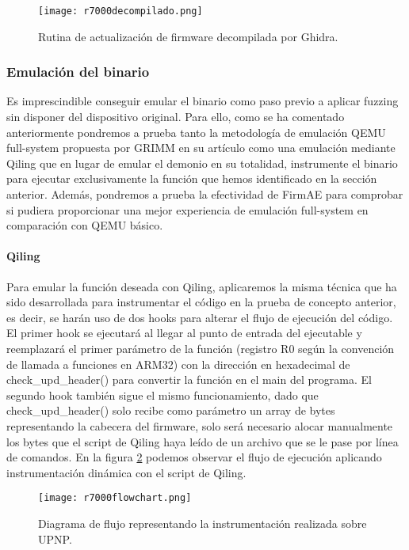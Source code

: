\begin{figure}[H]
    \centering
    \texttt{[image: r7000decompilado.png]}
    \caption{Rutina de actualización de firmware decompilada por Ghidra.}
    \label{fig:R7000decompilado}
\end{figure}

\subsubsection{Emulación del binario}
Es imprescindible conseguir emular el binario como paso previo a aplicar fuzzing sin disponer del dispositivo original. Para ello, como se ha comentado 
anteriormente pondremos a prueba tanto la metodología de emulación QEMU full-system propuesta por GRIMM en su artículo como una emulación mediante 
Qiling\cite{qiling} que en lugar de emular el demonio en su totalidad, instrumente el binario para ejecutar exclusivamente la función que hemos identificado 
en la sección anterior. Además, pondremos a prueba la efectividad de FirmAE\cite{Kim2020} para comprobar si pudiera proporcionar una mejor experiencia de 
emulación full-system en comparación con QEMU básico.

\paragraph{Qiling}
Para emular la función deseada con Qiling, aplicaremos la misma técnica que ha sido desarrollada para instrumentar el código en la prueba de concepto anterior, es decir, se harán uso 
de dos hooks para alterar el flujo de ejecución del código. El primer hook se ejecutará al llegar al punto de entrada del ejecutable y reemplazará el primer 
parámetro de la función (registro R0 según la convención de llamada a funciones en ARM32) con la dirección en hexadecimal de check\_upd\_header() para convertir 
la función en el main del programa. El segundo hook también sigue el mismo funcionamiento, dado que check\_upd\_header() solo recibe como parámetro un array 
de bytes representando la cabecera del firmware, solo será necesario alocar manualmente los bytes que el script de Qiling haya leído de un archivo que se le 
pase por línea de comandos. En la figura \ref{fig:R7000flowchart} podemos observar el flujo de ejecución aplicando instrumentación 
dinámica con el script de Qiling.

\begin{figure}[H]
    \centering
    \texttt{[image: r7000flowchart.png]}
    \caption{Diagrama de flujo representando la instrumentación realizada sobre UPNP.}
    \label{fig:R7000flowchart}
\end{figure}

